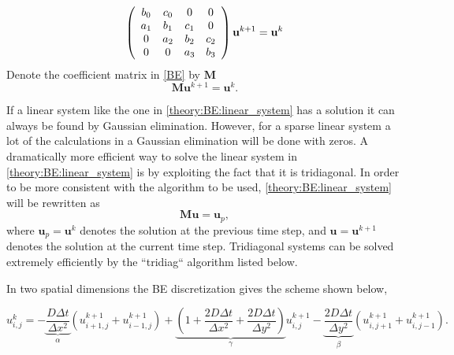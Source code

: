 \begin{align}\label{BE}
 \left(\begin{array}{c c c c}
        b_0 & c_0 &0 &0 \\
        a_1 & b_1 & c_1 &0 \\
        0& a_2 & b_2& c_2\\
        0& 0& a_3 & b_3\\
       \end{array}\right)\mathbf{u}^{k+1} = \mathbf{u}^{k}
\end{align}
\noindent Denote the coefficient matrix in \eqref{BE} by $\mathbf M$
\begin{equation}\label{theory:BE:linear_system}
  \mathbf{M}\mathbf{u}^{k+1} = \mathbf{u}^{k}.
\end{equation}

\noindent If a linear system like the one in \eqref{theory:BE:linear_system} has a solution it can always be found by Gaussian elimination. 
However, for a sparse linear system a lot of the calculations in a Gaussian elimination will be done with zeros. 
A dramatically more efficient way to solve the linear system in \eqref{theory:BE:linear_system} is by exploiting the fact that it is tridiagonal. 
In order to be more consistent with the algorithm to be used, \eqref{theory:BE:linear_system} will be rewritten as
\begin{equation}
  \mathbf{M}\mathbf{u} = \mathbf{u}_p,
\end{equation}
where $\mathbf{u}_p = \mathbf{u}^{k}$ denotes the solution at the previous time step, and $\mathbf{u} =\mathbf{u}^{k+1}$ denotes the solution at the current time step. 
Tridiagonal systems can be solved extremely efficiently by the ``tridiag`` algorithm listed below.

{

 }


In two spatial dimensions the BE discretization gives the scheme shown below,

\begin{equation}\label{general_scheme_BE2D}
 u^{k}_{i,j} = -\underbrace{\frac{D\Delta t}{\Delta x^2}}_{\alpha}\left(u^{k+1}_{i+1,j}+u^{k+1}_{i-1,j}\right) +
 \underbrace{\left(1+\frac{2D\Delta t}{\Delta x^2} +\frac{2D\Delta t}{\Delta y^2}\right)}_{\gamma}u^{k+1}_{i,j} 
 -\underbrace{\frac{2D\Delta t}{\Delta y^2}}_{\beta}\left(u^{k+1}_{i,j+1}+u^{k+1}_{i,j-1}\right).
\end{equation}

